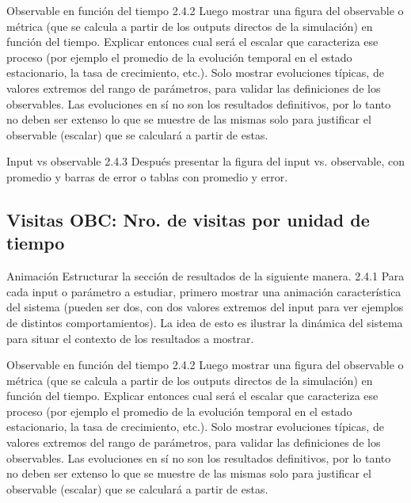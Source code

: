 \documentclass{beamer}
\begin{document}
    \begin{frame}{Observable en función del tiempo}
        2.4.2 Luego mostrar una figura del observable o métrica (que se calcula a partir de los outputs
        directos de la simulación) en función del tiempo. Explicar entonces cual será el escalar que
        caracteriza ese proceso (por ejemplo el promedio de la evolución temporal en el estado
        estacionario, la tasa de crecimiento, etc.). Solo mostrar evoluciones típicas, de valores extremos
        del rango de parámetros, para validar las definiciones de los observables. Las evoluciones en sí
        no son los resultados definitivos, por lo tanto no deben ser extenso lo que se muestre de las
        mismas solo para justificar el observable (escalar) que se calculará a partir de estas.
    \end{frame}

    \begin{frame}{Input vs observable}
        2.4.3 Después presentar la figura del input vs. observable, con promedio y barras de error o tablas
        con promedio y error.
    \end{frame}

    \subsection[Visitas OBC]{Visitas OBC: Nro. de visitas por unidad de tiempo}

    \begin{frame}{Animación}
        Estructurar la sección de resultados de la siguiente manera.
        2.4.1 Para cada input o parámetro a estudiar, primero mostrar una animación característica del
        sistema (pueden ser dos, con dos valores extremos del input para ver ejemplos de distintos
        comportamientos). La idea de esto es ilustrar la dinámica del sistema para situar el contexto de los
        resultados a mostrar.
    \end{frame}

    \begin{frame}{Observable en función del tiempo}
        2.4.2 Luego mostrar una figura del observable o métrica (que se calcula a partir de los outputs
        directos de la simulación) en función del tiempo. Explicar entonces cual será el escalar que
        caracteriza ese proceso (por ejemplo el promedio de la evolución temporal en el estado
        estacionario, la tasa de crecimiento, etc.). Solo mostrar evoluciones típicas, de valores extremos
        del rango de parámetros, para validar las definiciones de los observables. Las evoluciones en sí
        no son los resultados definitivos, por lo tanto no deben ser extenso lo que se muestre de las
        mismas solo para justificar el observable (escalar) que se calculará a partir de estas.
    \end{frame}
\end{document}
